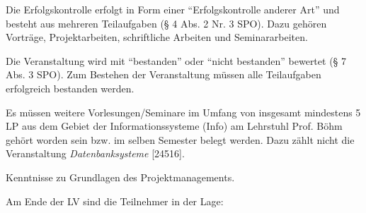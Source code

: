 \begin{course}

\setdoclanguagegerman
{}



\coursehead


\label{cour_7151.dp_997}


\begin{styleenv}
\begin{assessment}
Die Erfolgskontrolle erfolgt in Form einer “Erfolgskontrolle anderer Art” und besteht aus mehreren Teilaufgaben (§ 4 Abs. 2 Nr. 3 SPO). Dazu gehören Vorträge, Projektarbeiten, schriftliche Arbeiten und Seminararbeiten.

 

Die Veranstaltung wird mit “bestanden” oder “nicht bestanden” bewertet (§ 7 Abs. 3 SPO). Zum Bestehen der Veranstaltung müssen alle Teilaufgaben erfolgreich bestanden werden.


\end{assessment}

\begin{conditions}Es müssen weitere Vorlesungen/Seminare im Umfang von insgesamt mindestens 5 LP aus dem Gebiet der Informationssysteme (Info) am Lehrstuhl Prof. Böhm gehört worden sein bzw. im selben Semester belegt werden. Dazu zählt nicht die Veranstaltung \emph{Datenbanksysteme} [24516].

\end{conditions}

\begin{recommendations}Kenntnisse zu Grundlagen des Projektmanagements.

\end{recommendations}
\end{styleenv}

\begin{learningoutcomes}
Am Ende der LV sind die Teilnehmer in der Lage:


\end{learningoutcomes}
\end{course}
